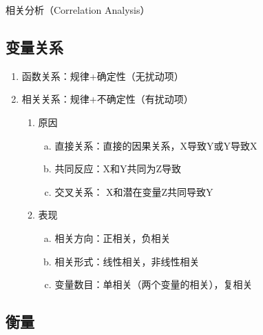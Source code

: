 \documentclass[12pt]{book}
\begin{document}
相关分析（Correlation Analysis）


\subsection{变量关系}

\begin{enumerate}[1.]
    \item 函数关系：规律+确定性（无扰动项）  
    \item 相关关系：规律+不确定性（有扰动项）  
    \begin{enumerate}[(1)]
        \item 原因  
        \begin{enumerate}[a.]
            \item 直接关系：直接的因果关系，X导致Y或Y导致X  
            \item 共同反应：X和Y共同为Z导致  
            \item 交叉关系： X和潜在变量Z共同导致Y  
        \end{enumerate}
        \item 表现  
        \begin{enumerate}[a.]
            \item 相关方向：正相关，负相关   
            \item 相关形式：线性相关，非线性相关  
            \item 变量数目：单相关（两个变量的相关），复相关  
        \end{enumerate}
    \end{enumerate}
\end{enumerate}




\subsection{衡量}
\end{document}
